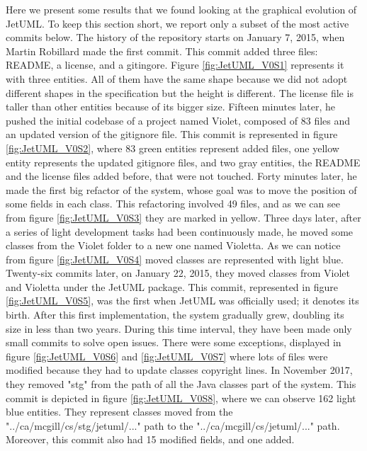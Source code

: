 Here we present some results that we found looking at the graphical evolution of JetUML. 
To keep this section short, we report only a subset of the most active commits below. 
\bigbreak
The history of the repository starts on January 7, 2015, when Martin Robillard made the first commit. 
This commit added three files: README, a license, and a gitingore. 
Figure \ref{fig:JetUML_V0S1} represents it with three entities. All of them have the same shape because we did not adopt different shapes in the specification but the height is different. The license file is taller than other entities because of its bigger size. 
\bigbreak
Fifteen minutes later, he pushed the initial codebase of a project named Violet, composed of 83 files and an updated version of the gitignore file. This commit is represented in figure \ref{fig:JetUML_V0S2}, where 83 green entities represent added files, one yellow entity represents the updated gitignore files, and two gray entities, the README and the license files added before, that were not touched.
\bigbreak
Forty minutes later, he made the first big refactor of the system, whose goal was to move the position of some fields in each class. This refactoring involved 49 files, and as we can see from figure \ref{fig:JetUML_V0S3} they are marked in yellow. 
\bigbreak
Three days later, after a series of light development tasks had been continuously made, he moved some classes from the Violet folder to a new one named Violetta. As we can notice from figure \ref{fig:JetUML_V0S4} moved classes are represented with light blue. 
\bigbreak
Twenty-six commits later, on January 22, 2015, they moved classes from Violet and Violetta under the JetUML package. This commit, represented in figure \ref{fig:JetUML_V0S5}, was the first when JetUML was officially used; it denotes its birth. 
\bigbreak
After this first implementation, the system gradually grew, doubling its size in less than two years. 
During this time interval, they have been made only small commits to solve open issues. There were some exceptions, displayed in figure \ref{fig:JetUML_V0S6} and \ref{fig:JetUML_V0S7} where lots of files were modified because they had to update classes copyright lines. 
\bigbreak
In November 2017, they removed "stg" from the path of all the Java classes part of the system. This commit is depicted in figure \ref{fig:JetUML_V0S8}, where we can observe 162 light blue entities. They represent classes moved from the "../ca/mcgill/cs/stg/jetuml/..." path to the 
"../ca/mcgill/cs/jetuml/..." path. Moreover, this commit also had 15 modified fields, and one added. 
